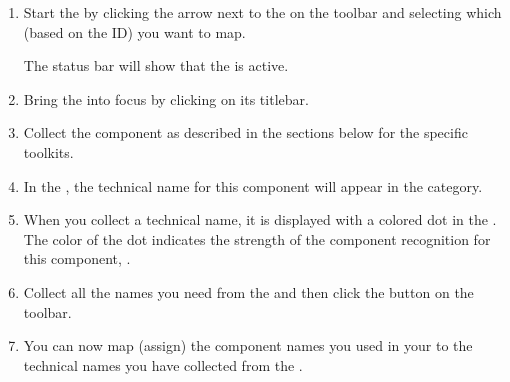 \begin{enumerate}
\item Start the \gdomm{} by clicking the arrow next to the on the toolbar and selecting which \gdaut{} (based on the \gdaut{} ID) you want to map. 


The status bar will show that the \gdomm{} is active. 
\item Bring the \gdaut{} into focus by clicking on its titlebar. 
\item Collect the component as described in the sections below for the specific toolkits.
 \item In the \gdomeditor{}, the technical name for this component will appear in the  category. 
\item When you collect a technical name, it is displayed with a colored dot in the \gdomeditor{}. The color of the dot indicates the strength of the component recognition for this component,  .
\item Collect all the names you need from the \gdaut{} and then click the  button on the toolbar. 
\item You can now map (assign) the component names you used in your \gdcases{} to the technical names you have collected from the \gdaut{} .
\end{enumerate}

